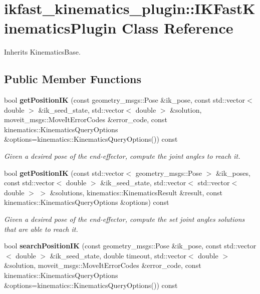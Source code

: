 \section{ikfast\-\_\-kinematics\-\_\-plugin\-:\-:I\-K\-Fast\-Kinematics\-Plugin Class Reference}
\label{classikfast__kinematics__plugin_1_1_i_k_fast_kinematics_plugin}


Inherits Kinematics\-Base.

\subsection*{Public Member Functions}
\begin{DoxyCompactItemize}
\item 
bool {\bf get\-Position\-I\-K} (const geometry\-\_\-msgs\-::\-Pose \&ik\-\_\-pose, const std\-::vector$<$ double $>$ \&ik\-\_\-seed\-\_\-state, std\-::vector$<$ double $>$ \&solution, moveit\-\_\-msgs\-::\-Move\-It\-Error\-Codes \&error\-\_\-code, const kinematics\-::\-Kinematics\-Query\-Options \&options=kinematics\-::\-Kinematics\-Query\-Options()) const 
\begin{DoxyCompactList}\small\item\em Given a desired pose of the end-\/effector, compute the joint angles to reach it. \end{DoxyCompactList}\item 
bool {\bf get\-Position\-I\-K} (const std\-::vector$<$ geometry\-\_\-msgs\-::\-Pose $>$ \&ik\-\_\-poses, const std\-::vector$<$ double $>$ \&ik\-\_\-seed\-\_\-state, std\-::vector$<$ std\-::vector$<$ double $>$ $>$ \&solutions, kinematics\-::\-Kinematics\-Result \&result, const kinematics\-::\-Kinematics\-Query\-Options \&options) const 
\begin{DoxyCompactList}\small\item\em Given a desired pose of the end-\/effector, compute the set joint angles solutions that are able to reach it. \end{DoxyCompactList}\item 
bool {\bf search\-Position\-I\-K} (const geometry\-\_\-msgs\-::\-Pose \&ik\-\_\-pose, const std\-::vector$<$ double $>$ \&ik\-\_\-seed\-\_\-state, double timeout, std\-::vector$<$ double $>$ \&solution, moveit\-\_\-msgs\-::\-Move\-It\-Error\-Codes \&error\-\_\-code, const kinematics\-::\-Kinematics\-Query\-Options \&options=kinematics\-::\-Kinematics\-Query\-Options()) const 

\end{DoxyCompactItemize}
